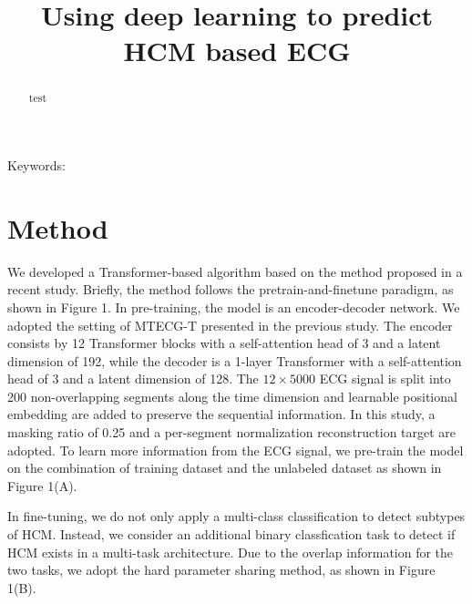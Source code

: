 \documentclass[11pt]{article}
\title{Using deep learning to predict HCM based ECG}
\date{}
\theoremstyle{definition}
\begin{document}
\maketitle


\begin{abstract}
test
\end{abstract}
Keywords: 

\section{Method}
\label{sec:method}

We developed a Transformer-based algorithm based on the method proposed in a recent study. Briefly,  the method follows the pretrain-and-finetune paradigm, as shown in Figure 1. In pre-training, the model is an encoder-decoder network. We adopted the setting of MTECG-T presented in the previous study. The encoder consists by 12 Transformer blocks with a self-attention head of 3 and a latent dimension  of 192, while the decoder is a 1-layer Transformer with a self-attention head of 3 and a latent dimension of 128.  The $12 \times 5000$ ECG signal is split into 200 non-overlapping segments along the time dimension and learnable positional embedding are added to preserve the sequential information. In this study, a masking ratio of 0.25 and a per-segment normalization reconstruction target are adopted. To learn more information from the ECG signal, we pre-train the model on the combination of training dataset and the unlabeled dataset as shown in Figure 1(A). 





In fine-tuning, we do not only apply a multi-class classification to detect subtypes of HCM. Instead, we consider an additional binary classfication task to detect if HCM exists in a multi-task architecture. Due to the overlap information for the two tasks, we adopt the hard parameter sharing method, as shown in Figure 1(B). 





\end{document}
